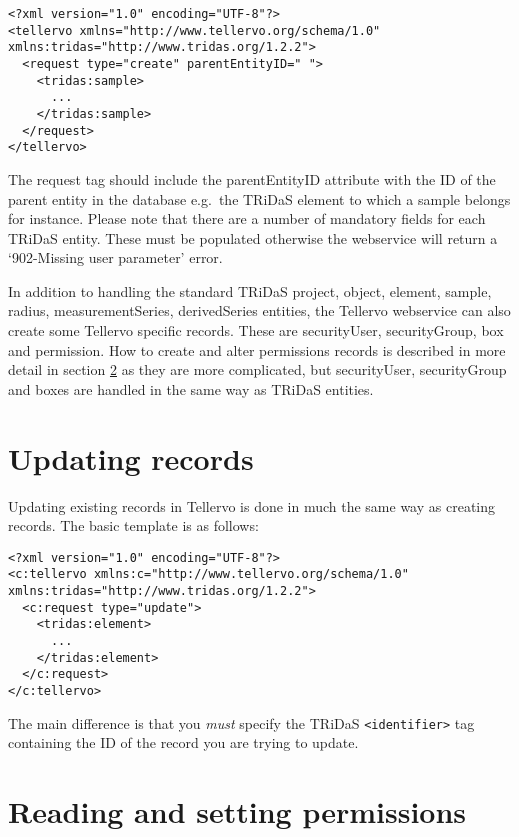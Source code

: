 \begin{lstlisting}
<?xml version="1.0" encoding="UTF-8"?>
<tellervo xmlns="http://www.tellervo.org/schema/1.0" xmlns:tridas="http://www.tridas.org/1.2.2">
  <request type="create" parentEntityID=" ">
    <tridas:sample>
      ...
    </tridas:sample>
  </request>
</tellervo>
\end{lstlisting}

The request tag should include the parentEntityID attribute with the ID of the parent entity in the database e.g.\ the TRiDaS element to which a sample belongs for instance.  Please note that there are a number of mandatory fields for each TRiDaS entity.  These must be populated otherwise the webservice will return a `902-Missing user parameter' error.

In addition to handling the standard TRiDaS project, object, element, sample, radius, measurementSeries, derivedSeries entities, the Tellervo webservice can also create some Tellervo specific records.  These are securityUser, securityGroup, box and permission.  How to create and alter permissions records is described in more detail in section \ref{txt:wsperms} as they are more complicated, but securityUser, securityGroup and boxes are handled in the same way as TRiDaS entities.


\section{Updating records}

Updating existing records in Tellervo is done in much the same way as creating records.  The basic template is as follows:

\begin{lstlisting}
<?xml version="1.0" encoding="UTF-8"?>
<c:tellervo xmlns:c="http://www.tellervo.org/schema/1.0" xmlns:tridas="http://www.tridas.org/1.2.2">
  <c:request type="update">
    <tridas:element>
      ...
    </tridas:element>
  </c:request>
</c:tellervo>
\end{lstlisting}

The main difference is that you \emph{must} specify the TRiDaS \lstinline$<identifier>$ tag containing the ID of the record you are trying to update. 


\section{Reading and setting permissions}
\label{txt:wsperms}



